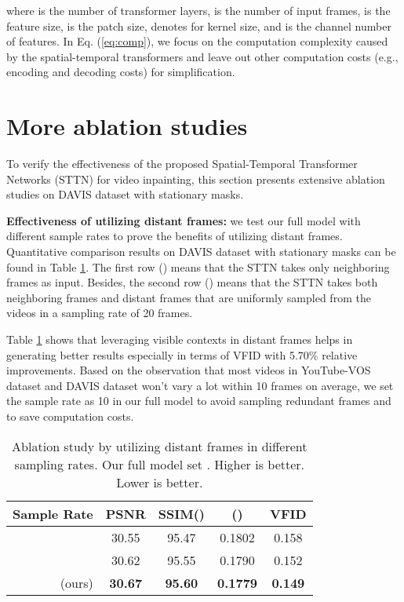 \documentclass[runningheads]{llncs}
\begin{document}
where  is the number of transformer layers,  is the number of input frames,  is the feature size,  is the patch size,  denotes for kernel size, and  is the channel number of features. In Eq. (\ref{eq:comp}), we focus on the computation complexity caused by the spatial-temporal transformers and leave out other computation costs (e.g., encoding and decoding costs) for simplification. 



\section{More ablation studies}
\label{sec:ab}

To verify the effectiveness of the proposed Spatial-Temporal Transformer Networks (STTN) for video inpainting, this section presents extensive ablation studies on DAVIS dataset \cite{caelles20182018} with stationary masks. 

\textbf{Effectiveness of utilizing distant frames:}
we test our full model with different sample rates to prove the benefits of utilizing distant frames. Quantitative comparison results on DAVIS dataset \cite{caelles20182018} with stationary masks can be found in Table \ref{tb:ab-frames}. The first row () means that the STTN takes only neighboring frames as input. Besides, the second row () means that the STTN takes both neighboring frames and distant frames that are uniformly sampled from the videos in a sampling rate of 20 frames. 

Table \ref{tb:ab-frames} shows that leveraging visible contexts in distant frames helps in generating better results especially in terms of VFID with 5.70\% relative improvements. Based on the observation that most videos in YouTube-VOS dataset \cite{xu2018youtube} and DAVIS dataset \cite{caelles20182018} won't vary a lot within 10 frames on average, we set the sample rate as 10 in our full model to avoid sampling redundant frames and to save computation costs. 


\begin{table}
   \begin{center}
   \begin{tabular}{r|c|c|c|c} 
    Sample Rate &PSNR &SSIM() & () &VFID \\\hline \hline
     &30.55 &95.47 &0.1802 &0.158 \\\hline 
      &30.62 &95.55 &0.1790 &0.152 \\\hline 
     (ours) &\textbf{30.67} &\textbf{95.60} &\textbf{0.1779} &\textbf{0.149} \\\hline 
   \end{tabular} 
\end{center}
   \caption{Ablation study by utilizing distant frames in different sampling rates. Our full model set .  Higher is better.  Lower is better. }
   \label{tb:ab-frames}
\end{table}
\end{document}
